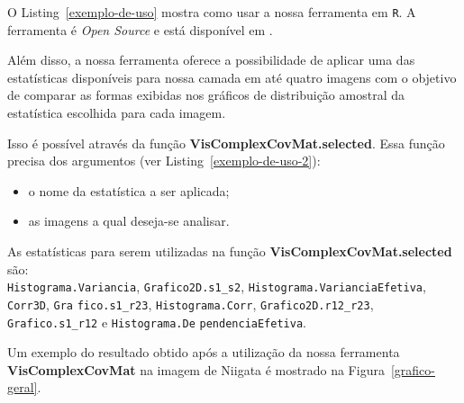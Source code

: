 \documentclass[a4paper,12pt]{article}
\begin{document}
O Listing~\ref{exemplo-de-uso} mostra como usar a nossa ferramenta em \texttt{R}. A ferramenta é \textit{Open Source} e está disponível em . 



Além disso, a nossa ferramenta oferece a possibilidade de aplicar uma das estatísticas disponíveis para nossa camada em até quatro imagens com o objetivo de comparar as formas exibidas nos gráficos de distribuição amostral da estatística escolhida para cada imagem.

Isso é possível através da função \textbf{VisComplexCovMat.selected}. Essa função precisa dos argumentos (ver Listing~\ref{exemplo-de-uso-2}):

\begin{itemize}
\item o nome da estatística a ser aplicada;
\item as imagens a qual deseja-se analisar. 
\end{itemize}

As estatísticas para serem utilizadas na função \textbf{VisComplexCovMat.selected} são:\\
\texttt{Histograma.Variancia}, \texttt{Grafico2D.s1\_s2}, \texttt{Histograma.VarianciaEfetiva}, \texttt{Corr3D}, \texttt{Gra} \texttt{fico.s1\_r23}, \texttt{Histograma.Corr}, \texttt{Grafico2D.r12\_r23}, \texttt{Grafico.s1\_r12} e \texttt{Histograma.De} \texttt{pendenciaEfetiva}.

   

Um exemplo do resultado obtido após a utilização da nossa ferramenta \textbf{VisComplexCovMat}  na imagem de Niigata é mostrado na Figura~\ref{grafico-geral}.

\newpage
\end{document}

